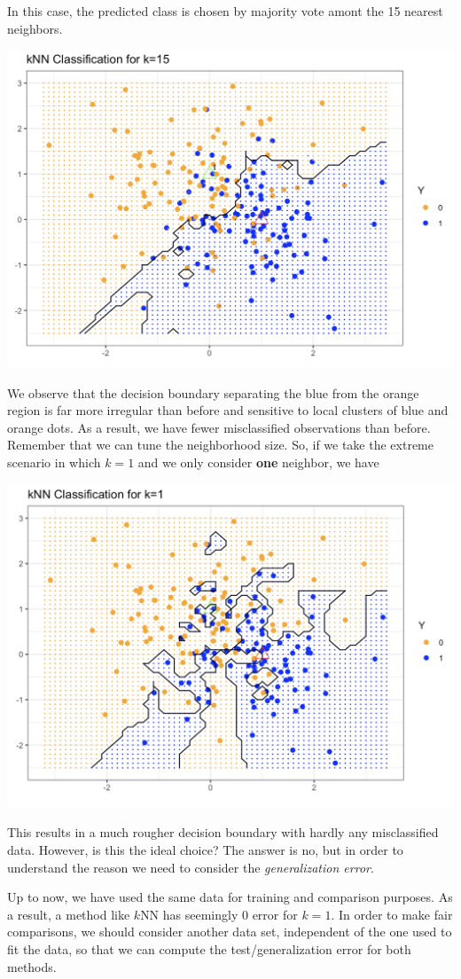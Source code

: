 \documentclass[
]{book}
\begin{document}
In this case, the predicted class is chosen by majority vote amont the 15 nearest neighbors.

\begin{center}\includegraphics[width=0.7\linewidth]{images/week1/kNN15} \end{center}

We observe that the decision boundary separating the blue from the orange region is far more irregular than before and sensitive to local clusters of blue and orange dots. As a result, we have fewer misclassified observations than before. Remember that we can tune the neighborhood size. So, if we take the extreme scenario in which \(k=1\) and we only consider \textbf{one} neighbor, we have

\begin{center}\includegraphics[width=0.7\linewidth]{images/week1/kNN1} \end{center}

This results in a much rougher decision boundary with hardly any misclassified data. However, is this the ideal choice? The answer is no, but in order to understand the reason we need to consider the \emph{generalization error}.

Up to now, we have used the same data for training and comparison purposes. As a result, a method like \(k\)NN has seemingly 0 error for \(k=1\). In order to make fair comparisons, we should consider another data set, independent of the one used to fit the data, so that we can compute the test/generalization error for both methods.
\end{document}
